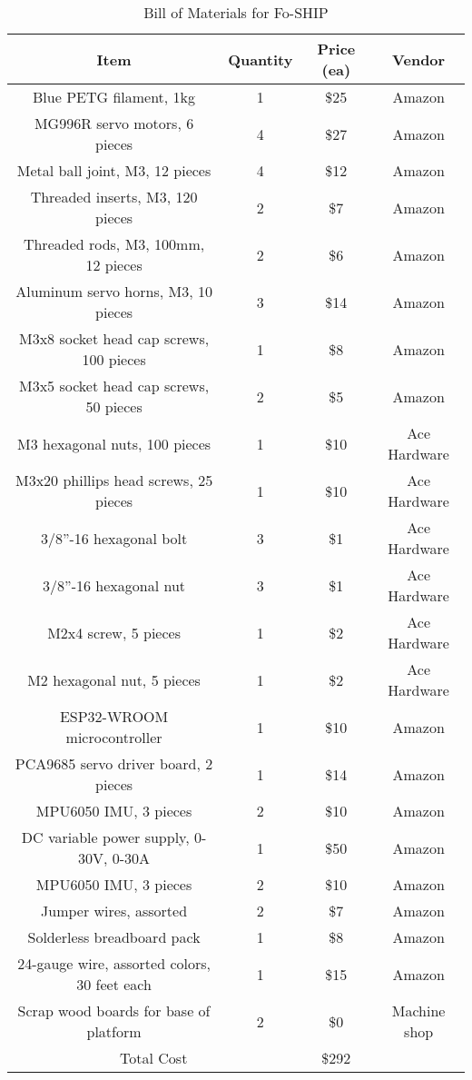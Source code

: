 \documentclass[12pt,a4paper]{report}
\begin{document}
\begin{table}[htbp]
	\centering
	\caption{Bill of Materials for Fo-SHIP}
	\label{tab:bomfoship}
	\begin{tabular}{|c|c|c|c|}
		\hline
		Item & Quantity & Price (ea) & Vendor \\
		\hline
		Blue PETG filament, 1kg & 1 & \$25 & Amazon \\
		\hline
		MG996R servo motors, 6 pieces & 4 & \$27 & Amazon \\
		\hline
		Metal ball joint, M3, 12 pieces & 4 & \$12 & Amazon \\
		\hline
		Threaded inserts, M3, 120 pieces & 2 & \$7 & Amazon \\
		\hline
		Threaded rods, M3, 100mm, 12 pieces & 2 & \$6 & Amazon \\
		\hline
		Aluminum servo horns, M3, 10 pieces & 3 & \$14 & Amazon \\
		\hline
		M3x8 socket head cap screws, 100 pieces & 1 & \$8 & Amazon \\
		\hline
		M3x5 socket head cap screws, 50 pieces & 2 & \$5 & Amazon \\
		\hline
		M3 hexagonal nuts, 100 pieces & 1 & \$10 & Ace Hardware \\
		\hline
		M3x20 phillips head screws, 25 pieces & 1 & \$10 & Ace Hardware \\
		\hline
		3/8”-16 hexagonal bolt & 3 & \$1 & Ace Hardware \\
		\hline
		3/8”-16 hexagonal nut & 3 & \$1 & Ace Hardware \\
		\hline
		M2x4 screw, 5 pieces & 1 & \$2 & Ace Hardware \\
		\hline
		M2 hexagonal nut, 5 pieces & 1 & \$2 & Ace Hardware \\
		\hline
		ESP32-WROOM microcontroller & 1 & \$10 & Amazon \\
		\hline
		PCA9685 servo driver board, 2 pieces & 1 & \$14 & Amazon \\
		\hline
		MPU6050 IMU, 3 pieces & 2 & \$10 & Amazon \\
		\hline
		DC variable power supply, 0-30V, 0-30A & 1 & \$50 & Amazon \\
		\hline
		MPU6050 IMU, 3 pieces & 2 & \$10 & Amazon \\
		\hline
		Jumper wires, assorted & 2 & \$7 & Amazon \\
		\hline
		Solderless breadboard pack & 1 & \$8 & Amazon \\
		\hline
		24-gauge wire, assorted colors, 30 feet each & 1 & \$15 & Amazon \\
		\hline
		Scrap wood boards for base of platform & 2 & \$0 & Machine shop \\
		\hline
		\multicolumn{2}{|c|}{Total Cost} & \$292 &  \\
		\hline
	\end{tabular}
\end{table}
\end{document}

